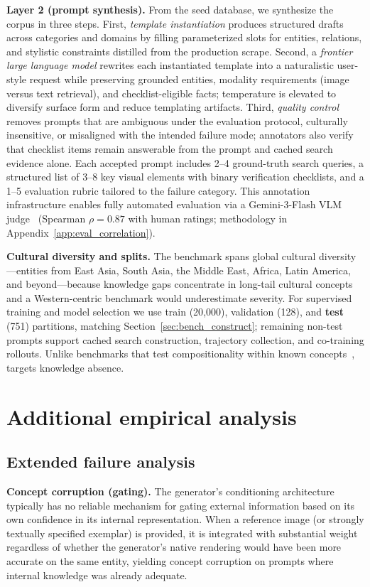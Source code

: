 \textbf{Layer 2 (prompt synthesis).}
From the seed database, we synthesize the \dataset{} corpus in three steps.
First, \emph{template instantiation} produces structured drafts across categories and domains by filling parameterized slots for entities, relations, and stylistic constraints distilled from the production scrape.
Second, a \emph{frontier large language model} rewrites each instantiated template into a naturalistic user-style request while preserving grounded entities, modality requirements (image versus text retrieval), and checklist-eligible facts; temperature is elevated to diversify surface form and reduce templating artifacts.
Third, \emph{quality control} removes prompts that are ambiguous under the evaluation protocol, culturally insensitive, or misaligned with the intended failure mode; annotators also verify that checklist items remain answerable from the prompt and cached search evidence alone.
Each accepted prompt includes 2--4
ground-truth search queries, a structured list of 3--8 key visual elements
with binary verification checklists, and a 1--5 evaluation rubric tailored
to the failure category. This annotation infrastructure enables fully
automated evaluation via a Gemini-3-Flash VLM judge~\cite{nanobanana2025gemini} (Spearman $\rho = 0.87$ with human
ratings; methodology in Appendix~\ref{app:eval_correlation}).

\textbf{Cultural diversity and splits.}
The benchmark spans global cultural diversity---entities from East Asia,
South Asia, the Middle East, Africa, Latin America, and beyond---because
knowledge gaps concentrate in long-tail cultural concepts and a
Western-centric benchmark would underestimate severity. For supervised
training and model selection we use train (20{,}000), validation (128), and
\textbf{test} (751) partitions, matching Section~\ref{sec:bench_construct}; remaining non-test prompts support cached
search construction, trajectory collection, and co-training rollouts.
Unlike benchmarks that test compositionality within known
concepts~\cite{genaibench,t2icompbench,dalleval}, \bench{} targets
knowledge absence.
\section{Additional empirical analysis}
\subsection{Extended failure analysis}
\label{app:failure_ext}

\textbf{Concept corruption (gating).}
The generator's conditioning architecture typically has no reliable mechanism
for gating external information based on its own confidence in its internal
representation. When a reference image (or strongly textually specified
exemplar) is provided, it is integrated with substantial weight regardless
of whether the generator's native rendering would have been more accurate
on the same entity, yielding concept corruption on prompts where internal
knowledge was already adequate.

